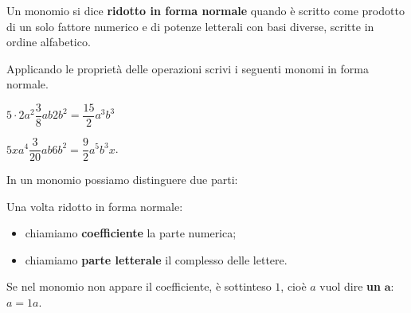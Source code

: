 \begin{definizione}{}{}
Un monomio si dice \textbf{ridotto in forma normale}
 quando è scritto come 
prodotto di un solo fattore numerico e di potenze letterali con basi 
diverse, scritte in ordine alfabetico.
\end{definizione}

\begin{esempio}{}{}
Applicando le proprietà delle operazioni scrivi i seguenti monomi in 
forma normale.

\begin{enumerate*} 
\item 
\(5 \cdot 2a^{2} \dfrac{3}{8}ab2b^{2} = \dfrac{15}{2}a^3b^3\) \qquad~
\item 
\(5 x a^{4}\dfrac{3}{20}ab6b^{2} = \dfrac{9}{2}a^{5}b^{3}x\).
\end{enumerate*}
\end{esempio}



In un monomio possiamo distinguere due parti:

\begin{definizione}{}{}
Una volta ridotto in forma normale: 
\begin{itemize} [nosep]
\item chiamiamo \textbf{coefficiente}
la parte numerica;
\item chiamiamo \textbf{parte letterale} il complesso delle
lettere.
\end{itemize}
\end{definizione}

Se nel monomio non appare il coefficiente, è sottinteso \(1\), 
cioè \(a\) vuol dire \textbf{un} \(\mathbf{a}\):~~ \(a = 1a\).

